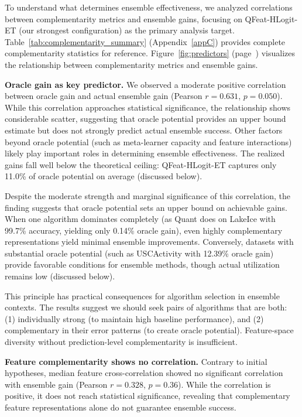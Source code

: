 \documentclass[pdflatex,sn-basic]{sn-jnl}           %
\theoremstyle{thmstyleone}%
\theoremstyle{thmstyletwo}%
\theoremstyle{thmstylethree}%
\begin{document}
To understand what determines ensemble effectiveness, we analyzed correlations between complementarity metrics and ensemble gains, focusing on QFeat-HLogit-ET (our strongest configuration) as the primary analysis target. Table~\ref{tab:complementarity_summary} (Appendix~\ref{appC}) provides complete complementarity statistics for reference. Figure~\ref{fig:predictors} (page~\pageref{fig:predictors}) visualizes the relationship between complementarity metrics and ensemble gains.

\textbf{Oracle gain as key predictor.} We observed a moderate positive correlation between oracle gain and actual ensemble gain (Pearson $r=0.631$, $p=0.050$). While this correlation approaches statistical significance, the relationship shows considerable scatter, suggesting that oracle potential provides an upper bound estimate but does not strongly predict actual ensemble success. Other factors beyond oracle potential (such as meta-learner capacity and feature interactions) likely play important roles in determining ensemble effectiveness. The realized gains fall well below the theoretical ceiling: QFeat-HLogit-ET captures only 11.0\% of oracle potential on average (discussed below).

Despite the moderate strength and marginal significance of this correlation, the finding suggests that oracle potential sets an upper bound on achievable gains. When one algorithm dominates completely (as Quant does on LakeIce with 99.7\% accuracy, yielding only 0.14\% oracle gain), even highly complementary representations yield minimal ensemble improvements. Conversely, datasets with substantial oracle potential (such as USCActivity with 12.39\% oracle gain) provide favorable conditions for ensemble methods, though actual utilization remains low (discussed below).

This principle has practical consequences for algorithm selection in ensemble contexts. The results suggest we should seek pairs of algorithms that are both: (1) individually strong (to maintain high baseline performance), and (2) complementary in their error patterns (to create oracle potential). Feature-space diversity without prediction-level complementarity is insufficient.

\textbf{Feature complementarity shows no correlation.} Contrary to initial hypotheses, median feature cross-correlation showed no significant correlation with ensemble gain (Pearson $r=0.328$, $p=0.36$). While the correlation is positive, it does not reach statistical significance, revealing that complementary feature representations alone do not guarantee ensemble success.
\end{document}
